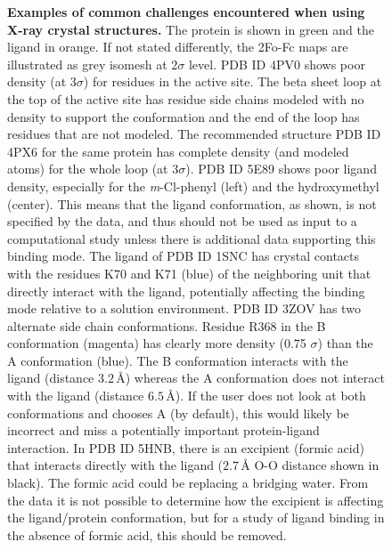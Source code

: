 \documentclass[9pt,bestpractices,pubversion]{livecoms}
\begin{document}
\begin{figure}
    \caption{
    \textbf{Examples of common challenges encountered when using X-ray crystal structures.}
    The protein is shown in green and the ligand in orange. If not stated differently, the 2Fo-Fc maps are illustrated as grey isomesh at $2\sigma$ level. 
    \textbf{} PDB ID 4PV0  shows poor density (at $3\sigma$) for residues in the active site.  The beta sheet loop at the top of the active site has residue side chains modeled with no density to support the conformation and the end of the loop has residues that are not modeled.
    \textbf{} The recommended structure PDB ID 4PX6 for the same protein  has complete density (and modeled atoms) for the whole loop (at $3\sigma$).
    \textbf{} PDB ID 5E89 shows poor ligand density, especially for the \textit{m}-Cl-phenyl (left) and the hydroxymethyl (center). This means that the ligand conformation, as shown, is not specified by the data, and thus should not be used as input to a computational study unless there is additional data supporting this binding mode.
    \textbf{} The ligand of PDB ID 1SNC has crystal contacts with the residues K70 and K71 (blue) of the neighboring unit that directly interact with the ligand, potentially affecting the binding mode relative to a solution environment.
    \textbf{} PDB ID 3ZOV has two
    alternate side chain conformations. Residue R368 in the B conformation (magenta) has clearly more density (0.75 $\sigma$) than the A conformation (blue). The B conformation interacts with the ligand (distance $3.2\,$\AA{}) whereas the A conformation does not interact with the ligand (distance $6.5\,$\AA{}). If the user does not look at both conformations and chooses A (by default), this would likely be incorrect and miss a potentially important protein-ligand interaction.  
    \textbf{} In PDB ID 5HNB, there is an excipient (formic acid) that interacts directly with the ligand ($2.7\,$\AA{} O-O distance shown in black).  The formic acid could be replacing a bridging water.  From the data it is not possible to determine how the excipient is affecting the ligand/protein conformation, but for a study of ligand binding in the absence of formic acid, this should be removed.
    }
    \label{fig:crystal1}
\end{figure}
\end{document}
